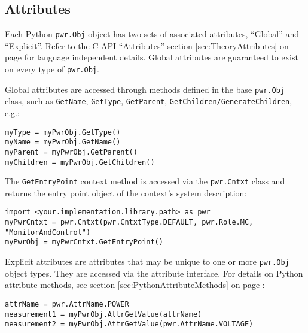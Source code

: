 \subsection{Attributes}\label{sec:PythonAttributes}

Each Python \texttt{pwr.Obj} object has two sets of associated attributes,
``Global'' and ``Explicit''. Refer to the C API ``Attributes'' section
\ref{sec:TheoryAttributes} on page \pageref{sec:TheoryAttributes} for language
independent details. Global attributes are guaranteed to exist on every type of
\texttt{pwr.Obj}.

Global attributes are accessed through methods defined in the base
\texttt{pwr.Obj} class, such as \texttt{GetName}, \texttt{GetType},
\texttt{GetParent}, \texttt{GetChildren/GenerateChildren}, e.g.:

\begin{center}\begin{minipage}{.95\linewidth}\begin{lstlisting}
myType = myPwrObj.GetType()
myName = myPwrObj.GetName()
myParent = myPwrObj.GetParent()
myChildren = myPwrObj.GetChildren()
\end{lstlisting}\end{minipage}\end{center}

The \texttt{GetEntryPoint} context method is accessed via the
\texttt{pwr.Cntxt} class and returns the entry point object of the context's
system description:

\begin{center}\begin{minipage}{.95\linewidth}\begin{lstlisting}
import <your.implementation.library.path> as pwr
myPwrCntxt = pwr.Cntxt(pwr.CntxtType.DEFAULT, pwr.Role.MC, "MonitorAndControl")
myPwrObj = myPwrCntxt.GetEntryPoint()
\end{lstlisting}\end{minipage}\end{center}

Explicit attributes are attributes that may be unique to one or more
\texttt{pwr.Obj} object types. They are accessed via the attribute interface.
For details on Python attribute methods, see section
\ref{sec:PythonAttributeMethods} on page \pageref{sec:PythonAttributeMethods}:

\begin{center}\begin{minipage}{.95\linewidth}\begin{lstlisting}
attrName = pwr.AttrName.POWER
measurement1 = myPwrObj.AttrGetValue(attrName)
measurement2 = myPwrObj.AttrGetValue(pwr.AttrName.VOLTAGE)
\end{lstlisting}\end{minipage}\end{center}

